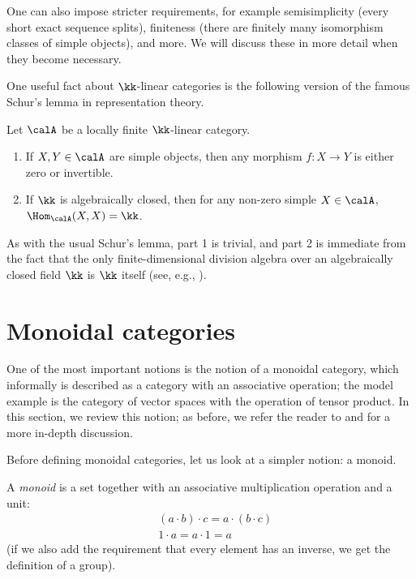 One can also impose stricter requirements, for example semisimplicity (every
short exact sequence splits), finiteness (there are finitely many isomorphism
classes of simple objects), and more. We will discuss these in more detail when
they become necessary.

One useful fact about $\kk$-linear categories is the following version of the
famous Schur's lemma in representation theory.

\begin{lemma}\label{l:schur}
  Let $\calA$ be a locally finite $\kk$-linear category.
  \begin{enumerate}
    \item If $X,Y\in \calA$ are simple objects, then any morphism
      $f\colon X\to Y$ is either zero or invertible.
    \item If $\kk$ is algebraically closed, then for any non-zero
      simple $X\in \calA$, $\Hom_\calA(X,X)=\kk$.
  \end{enumerate}
\end{lemma}
As with the usual Schur's lemma, part 1 is trivial, and part 2 is immediate
from the fact that the only finite-dimensional division algebra over an
algebraically closed field $\kk$ is $\kk$ itself (see, e.g.,
\cite[Lemma 3.5]{pierce}).

\section{Monoidal categories}\label{s:monoidal}
One of the most important notions is the notion of a monoidal category, which
informally is described as a category with an associative operation; the model
example is the category of vector spaces with the operation of tensor product.
In this section, we review this notion; as before, we refer the reader to
\cite[Chapter 2]{etingof-fusion} and \cite[Section 1.2]{leinster} for a more
in-depth discussion.

Before defining monoidal categories, let us look at a simpler notion: a monoid.

A \emph{monoid} is a set together with an associative
multiplication operation and a unit:
\begin{align*}
  &(a\cdot b)\cdot c = a\cdot (b\cdot c)\\
  &1\cdot a = a\cdot 1 = a
\end{align*}
(if we also add the requirement that every element has an inverse,
we get the definition of a group).

